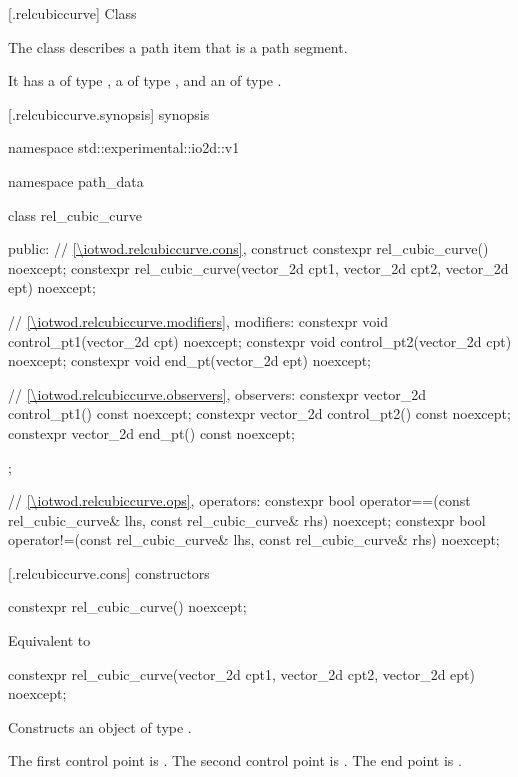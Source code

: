  [\iotwod.relcubiccurve] {Class }

\pnum
{}%
The class  describes a path item that is a path segment.

\pnum
It has a  of type , a  of type , and an  of type .

 [\iotwod.relcubiccurve.synopsis] { synopsis}

\begin{codeblock}
namespace std::experimental::io2d::v1 {
  namespace path_data {
    class rel_cubic_curve {
    public:
      // \ref{\iotwod.relcubiccurve.cons}, construct
      constexpr rel_cubic_curve() noexcept;
      constexpr rel_cubic_curve(vector_2d cpt1, vector_2d cpt2,
        vector_2d ept) noexcept;

      // \ref{\iotwod.relcubiccurve.modifiers}, modifiers:
      constexpr void control_pt1(vector_2d cpt) noexcept;
      constexpr void control_pt2(vector_2d cpt) noexcept;
      constexpr void end_pt(vector_2d ept) noexcept;

      // \ref{\iotwod.relcubiccurve.observers}, observers:
      constexpr vector_2d control_pt1() const noexcept;
      constexpr vector_2d control_pt2() const noexcept;
      constexpr vector_2d end_pt() const noexcept;
    };
    
    // \ref{\iotwod.relcubiccurve.ops}, operators:
    constexpr bool operator==(const rel_cubic_curve& lhs,
      const rel_cubic_curve& rhs) noexcept;
    constexpr bool operator!=(const rel_cubic_curve& lhs,
      const rel_cubic_curve& rhs) noexcept;
  }
}
\end{codeblock}

 [\iotwod.relcubiccurve.cons] { constructors}

%
\begin{itemdecl}
constexpr rel_cubic_curve() noexcept;
\end{itemdecl}
\begin{itemdescr}
\pnum
\effects
Equivalent to 
\end{itemdescr}

%
\begin{itemdecl}
constexpr rel_cubic_curve(vector_2d cpt1, vector_2d cpt2,
  vector_2d ept) noexcept;
\end{itemdecl}
\begin{itemdescr}
\pnum
\effects
Constructs an object of type .

\pnum
The first control point is . The second control point is . The end point is .
\end{itemdescr}

